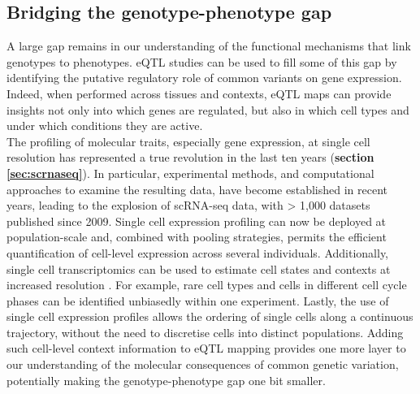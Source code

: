 
\subsection{Bridging the genotype-phenotype gap}
\label{sec:discussion_part2}

A large gap remains in our understanding of the functional mechanisms that link genotypes to phenotypes.
eQTL studies can be used to fill some of this gap by 
identifying the putative regulatory role of common variants on gene expression.
Indeed, when performed across tissues and contexts, eQTL maps can provide insights not only into which genes are regulated, but also in which cell types and under which conditions they are active.\\

The profiling of molecular traits, especially gene expression, at single cell resolution has represented a true revolution in the last ten years (\textbf{section
\ref{sec:scrnaseq}}).
In particular, experimental methods, and computational approaches to examine the resulting data, have become established in recent years, leading to the explosion of scRNA-seq data, with > 1,000 datasets published since 2009.
Single cell expression profiling can now be deployed at population-scale and, combined with pooling strategies, permits the efficient quantification of cell-level expression across several individuals.
Additionally, single cell transcriptomics can be used to estimate cell states and contexts at increased resolution \cite{buettner2017f}.
For example, rare cell types and cells in different cell cycle phases can be identified unbiasedly within one experiment.
Lastly, the use of single cell expression profiles allows the ordering of single cells along a continuous trajectory, without the need to discretise cells into distinct populations.
Adding such cell-level context information to eQTL mapping provides one more layer to our understanding of the molecular consequences of common genetic variation, potentially making the genotype-phenotype gap one bit smaller.\\

